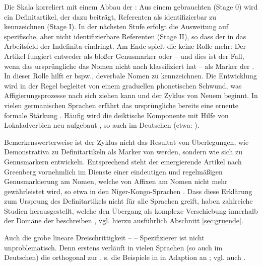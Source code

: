 Die Skala korreliert mit einem Abbau der : Aus einem  gebrauchten  (Stage 0) wird ein Definitartikel, der dazu beiträgt, Referenten als identifizierbar zu kennzeichnen (Stage I). In der nächsten Stufe erfolgt die Ausweitung auf spezifische,  aber nicht identifizierbare Referenten (Stage II), so dass der  in das Arbeitsfeld der Indefinita  eindringt. Am Ende spielt die  keine Rolle mehr: Der Artikel fungiert entweder als bloßer Genusmarker  oder -- und dies ist der Fall, wenn das ursprüngliche  das Nomen nicht nach  klassifiziert hat -- als Marker der  \parencite[Stage III;][69]{Greenberg1978}. In dieser Rolle hilft er bspw., deverbale Nomen zu kennzeichnen. Die Entwicklung wird in der Regel begleitet von einem graduellen phonetischen Schwund, was Affigierungsprozesse  nach sich ziehen kann und der Zyklus von Neuem beginnt. In vielen germanischen Sprachen erfährt das ursprüngliche  bereits eine erneute formale Stärkung \parencite[302--303]{vanGelderen2007}. Häufig wird die deiktische Komponente mit Hilfe von Lokaladverbien  neu aufgebaut \parencite[s.][]{Diessel1999}, so auch im Deutschen (etwa:  ). 

Bemerkenswerterweise ist der Zyklus nicht das Resultat von Überlegungen, wie Demonstrativa  zu Definitartikeln als Marker von  werden, sondern wie sich  zu Genusmarkern  entwickeln. Entsprechend steht der emergierende Artikel nach Greenberg vornehmlich im Dienste einer eindeutigen und regelmäßigen Genusmarkierung  am Nomen, welche von Affixen  am Nomen nicht mehr gewährleistet wird, so etwa in den Niger-Kongo-Sprachen \parencite[55, 62]{Greenberg1978}. Dass diese Erklärung zum Ursprung des Definitartikels nicht für alle Sprachen greift, haben zahlreiche Studien herausgestellt, welche den Übergang als komplexe Verschiebung innerhalb der Domäne der  beschreiben \parencite[z.B.][]{Himmelmann1997,Lyons1999,Leiss2000,Demske2001}, vgl. hierzu ausführlich Abschnitt \ref{sec:gruende}.

Auch die grobe lineare Dreischrittigkeit  --  -- Spezifizierer  ist nicht unproblematisch. Denn erstens verläuft in vielen Sprachen (so auch im Deutschen) die  orthogonal zur , s. die Beispiele in  in Adaption an \textcite[245]{Studler2011}; vgl. auch \textcite{Lyons1999}. 

